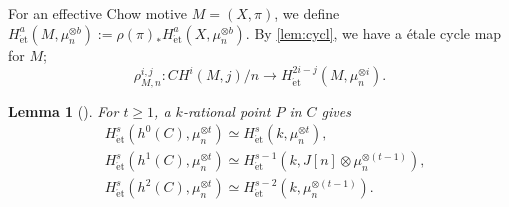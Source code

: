 \documentclass[a4paper,12pt]{amsart}
\numberwithin{equation}{section}
\newtheorem{lem}[lem]{Lemma}
\theoremstyle{definition}
\newcommand{\et}{\mathrm{\acute et}}
\newcommand{\Het}{H_{\mathrm{\acute et}}}
\begin{document}
For an effective Chow motive $M=(X,\pi)$, we define $H_\et^a(M,\mu_n^{\otimes b}):=\rho(\pi)_\ast H_\et^a(X,\mu_n^{\otimes b})$.
By \autoref{lem:cycl}, we have a \'etale cycle map for $M$;
$$
\rho^{i,j}_{M,n}:CH^i(M,j)/n\to H_\et^{2i-j}(M,\mu_n^{\otimes i}).
$$

\begin{lem}[]\label{lem:decomp_Het}
    For $t\ge 1$, a $k$-rational point $P$ in $C$ gives
    \begin{align}
    &H^{s}_\et(h^0(C),\mu_n^{\otimes t})
    \simeq \Het^{s}(k,\mu_n^{\otimes t}),\\
    &H^s_\et(h^1(C),\mu_n^{\otimes t})
    \simeq H_\et^{s-1}(k,J[n]\otimes\mu_n^{\otimes (t-1)}),\\
    &H^{s}_\et(h^2(C),\mu_n^{\otimes t})
    \simeq H_\et^{s-2}(k,\mu_n^{\otimes (t-1)}).
    \end{align}
\end{lem}
\end{document}
